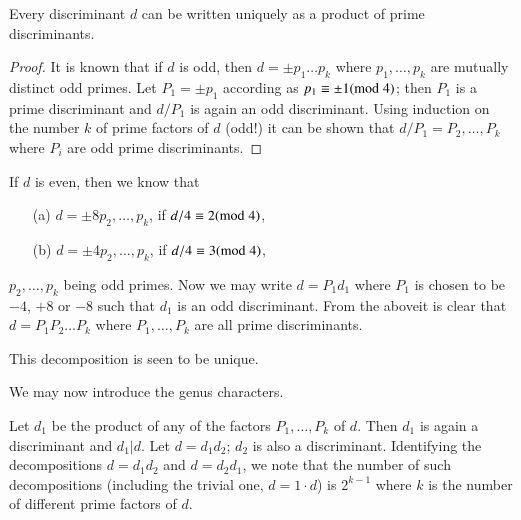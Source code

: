 \begin{proposition}\label{prop9}
Every discriminant $d$ can be written uniquely as a product of prime
discriminants. 
\end{proposition}

\begin{proof}
It is known that if $d$ is odd, then $d=\pm p_{1}\ldots p_{k}$ where
$p_{1},\ldots,p_{k}$ are mutually distinct odd primes. Let $P_{1}=\pm
p_{1}$ according as $p_{1}\equiv \pm 1(\rm{mod} \; 4)$; then $P_{1}$ is a
prime discriminant and $d/P_{1}$ is again an odd discriminant. Using
induction on the number $k$ of prime factors of $d$ (odd!) it can be
shown that $d/P_{1}=P_{2},\ldots,P_{k}$ where $P_{i}$ are odd prime
discriminants. 
\end{proof}

If $d$ is even, then we know that
\begin{itemize}
\item[(a)] $d=\pm 8p_{2},\ldots,p_{k}$, if $d/4\equiv 2(\rm{mod} \; 4)$,

\item[(b)] $d=\pm 4 p_{2},\ldots,p_{k}$, if $d/4\equiv 3(\rm{mod} \; 4)$,
\end{itemize}
$p_{2},\ldots,p_{k}$ being odd primes. Now we may write $d=P_{1}d_{1}$
where $P_{1}$ is chosen to be $-4$, $+8$ or $-8$ such that $d_{1}$ is
an odd discriminant. From the above\pageoriginale it is clear that
$d=P_{1}P_{2}\ldots P_{k}$ where $P_{1},\ldots,P_{k}$ are all prime
discriminants.

This decomposition is seen to be unique.

We may now introduce the genus characters.

Let $d_{1}$ be the product of any of the factors $P_{1},\ldots,P_{k}$
of $d$. Then $d_{1}$ is again a discriminant and $d_{1}|d$. Let
$d=d_{1}d_{2}$; $d_{2}$ is also a discriminant. Identifying the
decompositions $d=d_{1}d_{2}$ and $d=d_{2}d_{1}$, we note that the
number of such decompositions (including the trivial one, $d=1\cdot
d$) is $2^{k-1}$ where $k$ is the number of different prime factors of
$d$.

